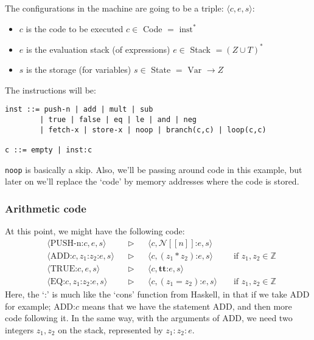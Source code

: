 \documentclass[11pt,a4paper,headsepline,titlepage,dvipsnames,cmyk]{scrartcl}
\begin{document}
The configurations in the machine are going to be a triple: $\langle c, e,
s \rangle$:
\begin{itemize}
    \item $c$ is the code to be executed $c \in$ Code $= \text{ inst}^*$
    \item $e$ is the evaluation stack (of expressions) $e \in$ Stack $= (Z
        \cup T)^*$
    \item $s$ is the storage (for variables) $s \in$ State $= \text{ Var }
        \rightarrow Z$
\end{itemize}

The instructions will be:

\begin{lstlisting}
inst ::= push-n | add | mult | sub
        | true | false | eq | le | and | neg
        | fetch-x | store-x | noop | branch(c,c) | loop(c,c)

c ::= empty | inst:c
\end{lstlisting}

\lstinline|noop| is basically a skip. Also, we'll be passing around code
in this example, but later on we'll replace the `code' by memory addresses
where the code is stored.

\subsubsection{Arithmetic code}%
\label{ssub:code-1}
At this point, we might have the following code:
\begin{align*}
    &\langle \text{PUSH-n:}c, e, s \rangle &  &\triangleright & &\langle c,
    \mathcal{N}[[n]] \text{:}e, s \rangle \\
    &\langle \text{ADD:}c, z_1 \text{:} z_2 \text{:}e, s \rangle & &\triangleright & &\langle c,
    (z_1 * z_2) \text{:}e, s \rangle & &\text{ if } z_1, z_2 \in \mathbb{Z} \\
     &\langle \text{TRUE:}c, e, s \rangle & &\triangleright & &\langle c,
     \textbf{tt}\text{:}e, s \rangle \\
     &\langle \text{EQ:}c, z_1 \text{:} z_2 \text{:}e, s \rangle & &\triangleright &
     &\langle c, (z_1 = z_2) \text{:}e, s \rangle & &\text{ if } z_1,z_2 \in
     \mathbb{Z}
\end{align*}
Here, the `:' is much like the `cons' function from Haskell, in that if we
take ADD for example; ADD:$c$ means that we have the statement ADD, and
then more code following it. In the same way, with the arguments of ADD,
we need two integers $z_1, z_2$ on the stack, represented by $z_1 : z_2 :
e$.
\end{document}
